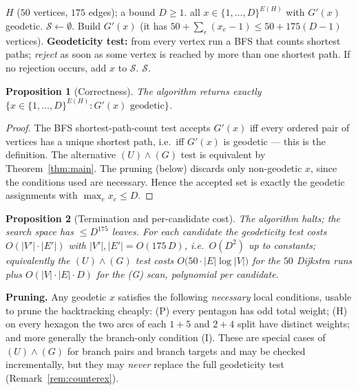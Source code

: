 \documentclass{amsart}
\newtheorem{proposition}{Proposition}
\theoremstyle{definition}
\begin{document}
\begin{algorithm}[H]
\caption{Enumerate geodetic homeomorphs of $H$ with $\max_e x_e\le D$}
\begin{algorithmic}[1]
\Require $H$ ($50$ vertices, $175$ edges); a bound $D\ge1$.
\Ensure all $x\in\{1,\dots,D\}^{E(H)}$ with $G'(x)$ geodetic.
\State $\mathcal S\gets\emptyset$.
  \State Build $G'(x)$ (it has $50+\sum_e(x_e-1)\le 50+175(D-1)$ vertices).
  \State \textbf{Geodeticity test:} from every vertex run a BFS that counts
  shortest paths; \emph{reject} as soon as some vertex is reached by more than
  one shortest path. 
  \State If no rejection occurs, add $x$ to $\mathcal S$.
\EndFor
\State \Return $\mathcal S$.
\end{algorithmic}
\end{algorithm}

\begin{proposition}[Correctness]
The algorithm returns exactly $\{x\in\{1,\dots,D\}^{E(H)}:G'(x)\text{ geodetic}\}$.
\end{proposition}
\begin{proof}
The BFS shortest-path-count test accepts $G'(x)$ iff every ordered pair of
vertices has a unique shortest path, i.e.\ iff $G'(x)$ is geodetic --- this is
the definition. The alternative $(U)\wedge(G)$ test is equivalent by
Theorem~\ref{thm:main}. The pruning (below) discards only non-geodetic $x$, since
the conditions used are necessary. Hence the accepted set is exactly the geodetic
assignments with $\max_e x_e\le D$.
\end{proof}

\begin{proposition}[Termination and per-candidate cost]
The algorithm halts; the search space has $\le D^{175}$ leaves. For each
candidate the geodeticity test costs $O(|V'|\cdot|E'|)$ with
$|V'|,|E'|=O(175\,D)$, i.e.\ $O(D^{2})$ up to constants; equivalently the
$(U)\wedge(G)$ test costs $O\!\big(50\cdot|E|\log|V|\big)$ for the $50$ Dijkstra
runs plus $O(|V|\cdot|E|\cdot D)$ for the (G) scan, polynomial per candidate.
\end{proposition}

\noindent\textbf{Pruning.} Any geodetic $x$ satisfies the following \emph{necessary}
local conditions, usable to prune the backtracking cheaply:
(P) every pentagon has odd total weight; (H) on every hexagon the two arcs of
each $1{+}5$ and $2{+}4$ split have distinct weights; and more generally the
branch-only condition (I). These are special cases of $(U)\wedge(G)$ for branch
pairs and branch targets and may be checked incrementally, but they may
\emph{never} replace the full geodeticity test (Remark~\ref{rem:counterex}).
\end{document}

